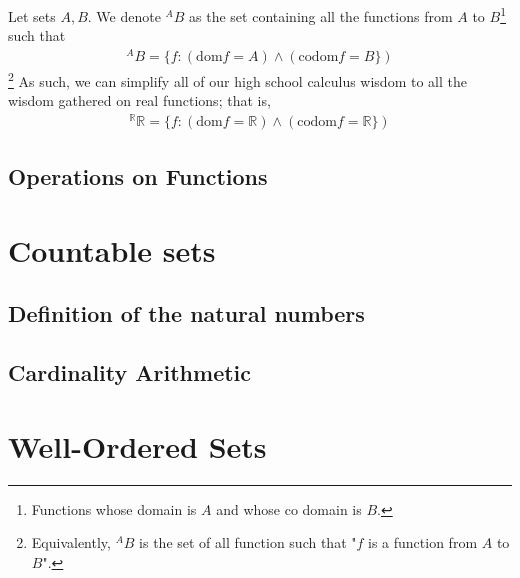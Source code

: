 \documentclass{tufte-handout} %
\theoremstyle{definition}
\theoremstyle{remark}
\newcommand{\R}{\mathbb{R}}
\begin{document}
Let sets $A,B$. We denote $^{A}B$ as the set containing all the functions from $A$ to $B$\footnote{Functions whose domain is $A$ and whose co domain is $B$.} such that 
\begin{align*}
    ^{A}B = \{f: (\mathrm{dom}{f}=A) \land (\mathrm{codom}{f}=B\})
\end{align*}\footnote{Equivalently, $^{A}B$ is the set of all function such that "$f$ is a function from $A$ to $B$".} As such, we can simplify all of our high school calculus wisdom to all the wisdom gathered on real functions; that is,
\begin{align*}
    ^{\R}\R = \{f: (\mathrm{dom}{f}=\R) \land (\mathrm{codom}{f}=\R\})
\end{align*}



\subsection{Operations on Functions}
\section{Countable sets}
\subsection{Definition of the natural numbers}
\subsection{Cardinality Arithmetic}


\section{Well-Ordered Sets}
\end{document}
